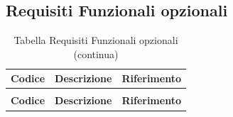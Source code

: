 \documentclass[a4paper,12pt]{article}
\begin{document}
\subsection{Requisiti Funzionali opzionali} \label{subsection:requisiti_funzionali_opzionali}
\begin{center}
\renewcommand{\arraystretch}{1.5}
\begin{longtable}{|c|p{8.5cm}|>{\centering\arraybackslash}p{4cm}|}

\hline
\rowcolor{gray!60}
\textbf{Codice} & \textbf{Descrizione} & \textbf{Riferimento} \\
\hline
\endfirsthead
\caption[]{Tabella Requisiti Funzionali opzionali (continua)} \\
\hline
\rowcolor{gray!60}
\textbf{Codice} & \textbf{Descrizione} & \textbf{Riferimento} \\
\hline
\endhead


\end{longtable}
\end{center}
\end{document}
